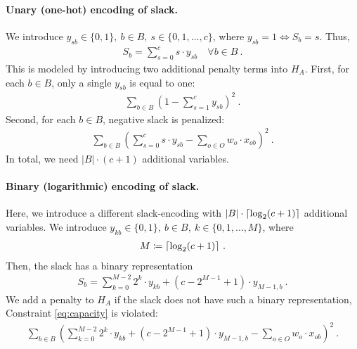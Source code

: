 \paragraph{Unary (one-hot) encoding of slack.}

We introduce $y_{sb}\in \{0,1\},\ b\in B,\ s \in \{0,1,\dots,c\}$, where
$y_{sb} = 1 \Leftrightarrow S_b = s$.
Thus,
\begin{align}
	S_b = \sum_{s= 0}^{c}s\cdot y_{sb} \quad\forall b\in B\ .
\end{align}
This is modeled by introducing two additional penalty terms into $H_A$.
First, for each $b\in B$, only a single $y_{sb}$ is equal to one:
\begin{align}
	\sum_{b \in B}\left(1 - \sum_{s= 1}^{c}y_{sb}\right)^2\ .
\end{align}
Second, for each $b\in B$, negative slack is penalized:
\begin{align}
	\sum_{b \in B}\left(\sum_{s= 0}^{c}s\cdot y_{sb} - \sum_{o\in O} w_o\cdot x_{ob} \right)^2\ .
\end{align}
In total, we need $|B| \cdot (c+1)$ additional variables.
\paragraph{Binary (logarithmic) encoding of slack.}
Here, we introduce a different slack-encoding with $|B| \cdot \ceil*{\log_2(c+1)}$ additional variables.
We introduce $y_{kb}\in \{0,1\},\ b\in B,\ k \in \{0,1,\dots,M\}$, where
\begin{align}
	M\coloneqq \ceil*{\log_2(c+1)}\ .
\end{align}
Then, the slack has a binary representation
\begin{align}
	S_b = \sum_{k=0}^{M-2}2^k\cdot y_{kb} + (c  - 2^{M-1} + 1)\cdot y_{M-1,b}\ .
\end{align}
We add a  penalty to $H_A$ if the slack does not have such a binary representation, \ie Constraint \eqref{eq:capacity} is violated:
\begin{align}
	\sum_{b \in B} \left(\sum_{k=0}^{M-2}2^k\cdot y_{kb} + (c  - 2^{M-1} + 1)\cdot y_{M-1,b} - \sum_{ o \in O}w_o\cdot x_{ob} \right)^2\ .
\end{align}